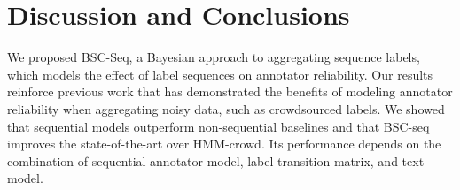 \section{Discussion and Conclusions}

We proposed BSC-Seq, a Bayesian approach to aggregating sequence labels, 
which models the effect of label sequences on annotator reliability.
Our results reinforce previous work that has demonstrated the benefits of modeling annotator reliability when aggregating noisy data, such as crowdsourced labels. 
We showed that sequential models outperform non-sequential baselines
and that 
BSC-seq improves the state-of-the-art over HMM-crowd.
Its performance depends on the combination of sequential annotator model, label transition matrix, and 
text model. 


